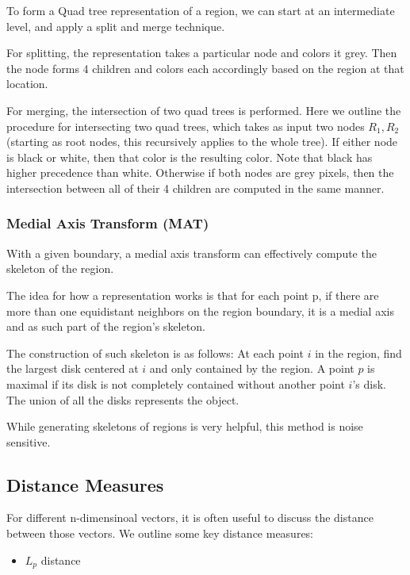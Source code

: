 \documentclass{article}
\begin{document}
\begin{multicols}{2}
To form a Quad tree representation of a region, we can start at an intermediate level, and apply a split and merge technique. 

For splitting, the representation takes a particular node and colors it grey. Then the node forms 4 children and colors each accordingly based on the region at that location. 

For merging, the intersection of two quad trees is performed. Here we outline the procedure for intersecting two quad trees, which takes as input two nodes $R_1, R_2$ (starting as root nodes, this recursively applies to the whole tree). If either node is black or white, then that color is the resulting color. Note that black has higher precedence than white. Otherwise if both nodes are grey pixels, then the intersection between all of their 4 children are computed in the same manner.

\subsubsection{Medial Axis Transform (MAT)}

With a given boundary, a medial axis transform can effectively compute the skeleton of the region.

The idea for how a representation works is that for each point p, if there are more than one equidistant neighbors on the region boundary, it is a medial axis and as such part of the region's skeleton.

The construction of such skeleton is as follows: At each point $i$ in the region, find the largest disk centered at $i$ and only contained by the region. A point $p$ is maximal if its disk is not completely contained without another point $i$'s disk. The union of all the disks represents the object.

While generating skeletons of regions is very helpful, this method is noise sensitive.

\subsection{Distance Measures}

For different n-dimensinoal vectors, it is often useful to discuss the distance between those vectors. We outline some key distance measures:

\begin{itemize}

\item $L_p$ distance
  

\end{itemize}
\end{multicols}
\end{document}
